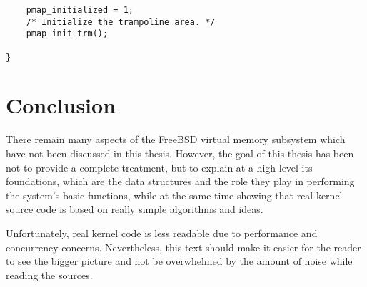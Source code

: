 \documentclass[shortabstract, english]{iithesis}
\newenvironment{code}{}{}
\begin{document}
\begin{code}
\begin{verbatim}
    pmap_initialized = 1;
    /* Initialize the trampoline area. */
    pmap_init_trm();

}
\end{verbatim}
\end{code}

\chapter{Conclusion}

There remain many aspects of the FreeBSD virtual memory subsystem which have not
been discussed in this thesis. However, the goal of this thesis has been not to
provide a complete treatment, but to explain at a high level its foundations,
which are the data structures and the role they play in performing the system's
basic functions, while at the same time showing that real kernel source code is
based on really simple algorithms and ideas.

Unfortunately, real kernel code is less readable due to performance and
concurrency concerns. Nevertheless, this text should make it easier for the
reader to see the bigger picture and not be overwhelmed by the amount of noise
while reading the sources.
\end{document}
